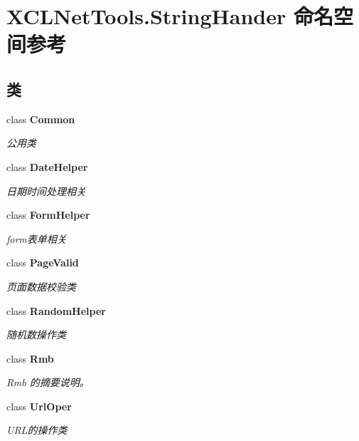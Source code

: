 \hypertarget{namespace_x_c_l_net_tools_1_1_string_hander}{}\section{X\+C\+L\+Net\+Tools.\+String\+Hander 命名空间参考}
\label{namespace_x_c_l_net_tools_1_1_string_hander}
\subsection*{类}
\begin{DoxyCompactItemize}
\item 
class {\bfseries Common}
\begin{DoxyCompactList}\small\item\em 公用类 \end{DoxyCompactList}\item 
class {\bfseries Date\+Helper}
\begin{DoxyCompactList}\small\item\em 日期时间处理相关 \end{DoxyCompactList}\item 
class {\bfseries Form\+Helper}
\begin{DoxyCompactList}\small\item\em form表单相关 \end{DoxyCompactList}\item 
class {\bfseries Page\+Valid}
\begin{DoxyCompactList}\small\item\em 页面数据校验类 \end{DoxyCompactList}\item 
class {\bfseries Random\+Helper}
\begin{DoxyCompactList}\small\item\em 随机数操作类 \end{DoxyCompactList}\item 
class {\bfseries Rmb}
\begin{DoxyCompactList}\small\item\em Rmb 的摘要说明。 \end{DoxyCompactList}\item 
class {\bfseries Url\+Oper}
\begin{DoxyCompactList}\small\item\em U\+R\+L的操作类 \end{DoxyCompactList}\end{DoxyCompactItemize}
